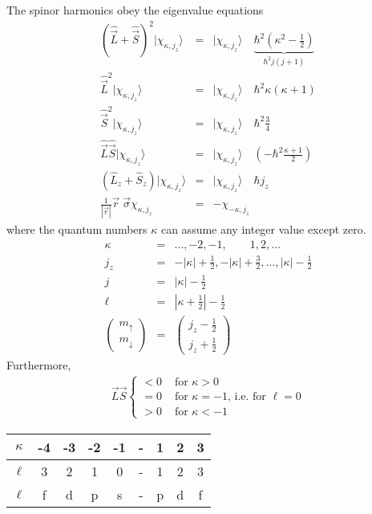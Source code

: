 \documentclass[11pt,a4paper]{report}
\begin{document}
The spinor harmonics obey the eigenvalue equations
\begin{eqnarray}
\left(\hat{\vec{L}}+\hat{\vec{S}}\right)^2|\chi_{\kappa,j_z}\rangle
&=&|\chi_{\kappa,j_z}\rangle\quad
\underbrace{\hbar^2(\kappa^2-\frac{1}{2})}_{\hbar^2j(j+1)}
\\
\hat{\vec{L}}^2|\chi_{\kappa,j_z}\rangle
&=&|\chi_{\kappa,j_z}\rangle\quad\hbar^2\kappa(\kappa+1)
\\
\hat{\vec{S}}^2|\chi_{\kappa,j_z}\rangle
&=&|\chi_{\kappa,j_z}\rangle\quad\hbar^2\frac{3}{4}
\\
\hat{\vec{L}}\hat{\vec{S}}|\chi_{\kappa,j_z}\rangle
&=&|\chi_{\kappa,j_z}\rangle
\quad\left(-\hbar^2\frac{\kappa+1}{2}\right)
\label{eq:lsspinorharmonic}
\\
\left(\hat{L}_z+\hat{S}_z\right)|\chi_{\kappa,j_z}\rangle
&=&|\chi_{\kappa,j_z}\rangle\quad\hbar j_z
\\
\frac{1}{|\vec{r}|}\vec{r}\;\vec{\sigma}\chi_{\kappa,j_z}&=&-\chi_{-\kappa,j_z}
\end{eqnarray}
where the quantum numbers $\kappa$ can assume any integer value except zero.
\begin{eqnarray}
\kappa&=&\ldots,-2,-1,\qquad 1,2,\ldots
\\
j_z&=&-|\kappa|+\frac{1}{2},-|\kappa|+\frac{3}{2},\ldots,|\kappa|-\frac{1}{2}
\\
j&=& |\kappa|-\frac{1}{2}
\\
\ell&=&|\kappa+\frac{1}{2}|-\frac{1}{2}
\\
\left(\begin{array}{c} m_{\uparrow}\\m_{\downarrow}\end{array}\right)
&=&\left(\begin{array}{c} j_z-\frac{1}{2}\\j_z+\frac{1}{2}\end{array}\right)
\end{eqnarray}
Furthermore, 
\begin{eqnarray}
\vec{L}\vec{S}
\begin{cases}
<0 & \text{ for $\kappa >0$}\\
=0 & \text{ for $\kappa =-1$, i.e. for $\ell=0$}\\
>0 & \text{ for $\kappa <-1$}
\end{cases}
\end{eqnarray}

\begin{center}
\begin{tabular}{|c|c|c|c|c|c|c|c|c|}
\hline
$\kappa$ & -4 & -3 & -2 & -1 & - & 1 & 2 & 3 \\
\hline
$\ell$   &  3 &  2 &  1 &  0 & - & 1 & 2 & 3 \\
\hline
$\ell$   &  f &  d &  p &  s & - & p & d & f \\
\hline
\end{tabular}
\end{center}
\end{document}
